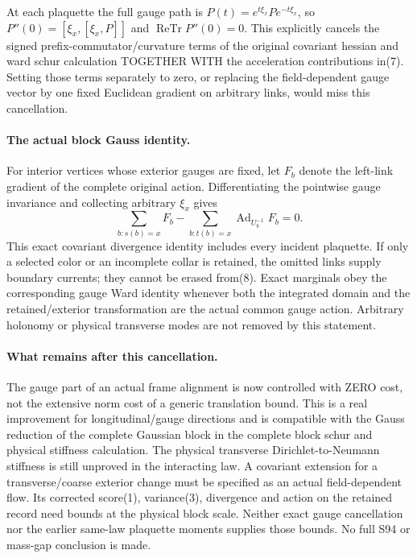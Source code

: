 \documentclass[11pt]{article}
\begin{document}
At each plaquette the full gauge path is
$P(t)=e^{t\xi_x}Pe^{-t\xi_x}$, so
$P''(0)=[\xi_x,[\xi_x,P]]$ and $\operatorname{ReTr}P''(0)=0$.
This explicitly cancels the signed prefix-commutator/curvature terms of
the original covariant hessian and ward schur calculation TOGETHER WITH the acceleration contributions in(7). Setting those
terms separately to zero, or replacing the field-dependent gauge vector by
one fixed Euclidean gradient on arbitrary links, would miss this cancellation.

\paragraph{The actual block Gauss identity.}
For interior vertices whose exterior gauges are fixed, let $F_b$ denote the
left-link gradient of the complete original action. Differentiating the
pointwise gauge invariance and collecting arbitrary $\xi_x$ gives
\[
 \sum_{b:s(b)=x}F_b-
 \sum_{b:t(b)=x}\operatorname{Ad}_{U_b^{-1}}F_b=0.                       \tag{8}
\]
This exact covariant divergence identity includes every incident plaquette.
If only a selected color or an incomplete collar is retained, the omitted
links supply boundary currents; they cannot be erased from(8).
Exact marginals obey the corresponding gauge Ward identity whenever both the
integrated domain and the retained/exterior transformation are the actual
common gauge action. Arbitrary holonomy or physical transverse modes are not
removed by this statement.

\paragraph{What remains after this cancellation.}
The gauge part of an actual frame alignment is now controlled with ZERO cost,
not the extensive norm cost of a generic translation bound. This is a real
improvement for longitudinal/gauge directions and is compatible with the Gauss
reduction of the complete Gaussian block in the complete block schur and physical stiffness calculation. The physical transverse
Dirichlet-to-Neumann stiffness is still unproved in the interacting law.
A covariant extension for a transverse/coarse exterior change must be specified
as an actual field-dependent flow. Its corrected score(1), variance(3),
divergence and action on the retained record need bounds at the physical block
scale. Neither exact gauge cancellation nor the earlier same-law plaquette
moments supplies those bounds. No full S94 or mass-gap conclusion is made.
\end{document}
